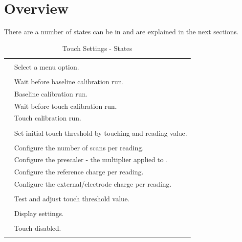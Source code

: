 \section{Overview}

There are a number of states  can be in and are explained in the next
sections.

\begin{longtabu} { X[1,c,m] | X[3,l,m] }
  \thrule
   &  \\ \mrule

   & Select a menu option. \\ \mrule
   \\ \mrule
   & Wait before baseline calibration run. \\ 
   & Baseline calibration run. \\ 
   & Wait before touch calibration run. \\ 
   & Touch calibration run. \\ \mrule
   \\ \mrule
   & Set initial touch threshold by touching and reading value. \\ \mrule
   \\ \mrule
   & Configure the number of scans per reading. \\ 
   & Configure the prescaler - the multiplier applied to . \\ 
   & Configure the reference charge per reading. \\ 
   & Configure the external\slash electrode charge per reading. \\ \mrule
   \\ \mrule
   & Test and adjust touch threshold value. \\ \mrule
   \\ \mrule
   & Display settings. \\ \mrule
   \\ \mrule
   & Touch disabled. \\
  \bhrule
\caption{Touch Settings - States}
\end{longtabu}

